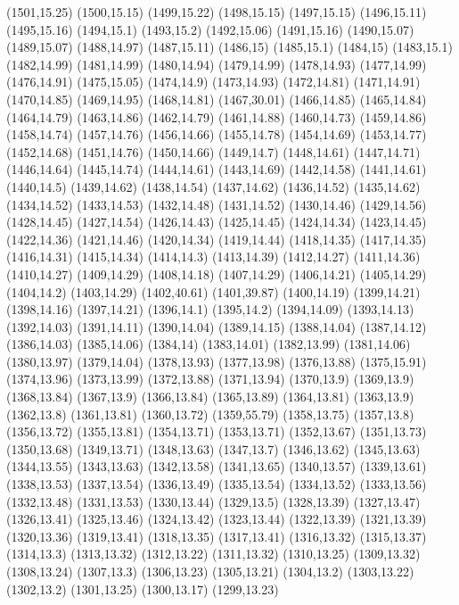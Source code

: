 (1501,15.25)
(1500,15.15)
(1499,15.22)
(1498,15.15)
(1497,15.15)
(1496,15.11)
(1495,15.16)
(1494,15.1)
(1493,15.2)
(1492,15.06)
(1491,15.16)
(1490,15.07)
(1489,15.07)
(1488,14.97)
(1487,15.11)
(1486,15)
(1485,15.1)
(1484,15)
(1483,15.1)
(1482,14.99)
(1481,14.99)
(1480,14.94)
(1479,14.99)
(1478,14.93)
(1477,14.99)
(1476,14.91)
(1475,15.05)
(1474,14.9)
(1473,14.93)
(1472,14.81)
(1471,14.91)
(1470,14.85)
(1469,14.95)
(1468,14.81)
(1467,30.01)
(1466,14.85)
(1465,14.84)
(1464,14.79)
(1463,14.86)
(1462,14.79)
(1461,14.88)
(1460,14.73)
(1459,14.86)
(1458,14.74)
(1457,14.76)
(1456,14.66)
(1455,14.78)
(1454,14.69)
(1453,14.77)
(1452,14.68)
(1451,14.76)
(1450,14.66)
(1449,14.7)
(1448,14.61)
(1447,14.71)
(1446,14.64)
(1445,14.74)
(1444,14.61)
(1443,14.69)
(1442,14.58)
(1441,14.61)
(1440,14.5)
(1439,14.62)
(1438,14.54)
(1437,14.62)
(1436,14.52)
(1435,14.62)
(1434,14.52)
(1433,14.53)
(1432,14.48)
(1431,14.52)
(1430,14.46)
(1429,14.56)
(1428,14.45)
(1427,14.54)
(1426,14.43)
(1425,14.45)
(1424,14.34)
(1423,14.45)
(1422,14.36)
(1421,14.46)
(1420,14.34)
(1419,14.44)
(1418,14.35)
(1417,14.35)
(1416,14.31)
(1415,14.34)
(1414,14.3)
(1413,14.39)
(1412,14.27)
(1411,14.36)
(1410,14.27)
(1409,14.29)
(1408,14.18)
(1407,14.29)
(1406,14.21)
(1405,14.29)
(1404,14.2)
(1403,14.29)
(1402,40.61)
(1401,39.87)
(1400,14.19)
(1399,14.21)
(1398,14.16)
(1397,14.21)
(1396,14.1)
(1395,14.2)
(1394,14.09)
(1393,14.13)
(1392,14.03)
(1391,14.11)
(1390,14.04)
(1389,14.15)
(1388,14.04)
(1387,14.12)
(1386,14.03)
(1385,14.06)
(1384,14)
(1383,14.01)
(1382,13.99)
(1381,14.06)
(1380,13.97)
(1379,14.04)
(1378,13.93)
(1377,13.98)
(1376,13.88)
(1375,15.91)
(1374,13.96)
(1373,13.99)
(1372,13.88)
(1371,13.94)
(1370,13.9)
(1369,13.9)
(1368,13.84)
(1367,13.9)
(1366,13.84)
(1365,13.89)
(1364,13.81)
(1363,13.9)
(1362,13.8)
(1361,13.81)
(1360,13.72)
(1359,55.79)
(1358,13.75)
(1357,13.8)
(1356,13.72)
(1355,13.81)
(1354,13.71)
(1353,13.71)
(1352,13.67)
(1351,13.73)
(1350,13.68)
(1349,13.71)
(1348,13.63)
(1347,13.7)
(1346,13.62)
(1345,13.63)
(1344,13.55)
(1343,13.63)
(1342,13.58)
(1341,13.65)
(1340,13.57)
(1339,13.61)
(1338,13.53)
(1337,13.54)
(1336,13.49)
(1335,13.54)
(1334,13.52)
(1333,13.56)
(1332,13.48)
(1331,13.53)
(1330,13.44)
(1329,13.5)
(1328,13.39)
(1327,13.47)
(1326,13.41)
(1325,13.46)
(1324,13.42)
(1323,13.44)
(1322,13.39)
(1321,13.39)
(1320,13.36)
(1319,13.41)
(1318,13.35)
(1317,13.41)
(1316,13.32)
(1315,13.37)
(1314,13.3)
(1313,13.32)
(1312,13.22)
(1311,13.32)
(1310,13.25)
(1309,13.32)
(1308,13.24)
(1307,13.3)
(1306,13.23)
(1305,13.21)
(1304,13.2)
(1303,13.22)
(1302,13.2)
(1301,13.25)
(1300,13.17)
(1299,13.23)
